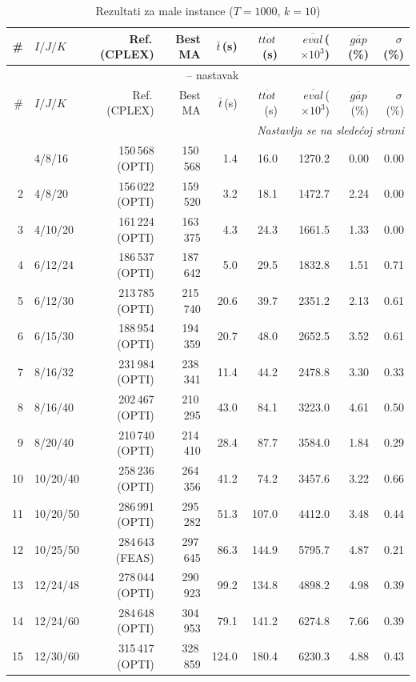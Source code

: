 \documentclass[12pt,a4paper]{article}
\begin{document}
\begin{longtable}{r l r r r r r r r}
\caption{Rezultati za male instance ($T=1000$, $k=10$)} \\
\toprule
\# & $I/J/K$ & Ref.\,(CPLEX) & Best MA & $\bar t$\,(s) & $\overline{ttot}$\,(s) & $\overline{eval}$\,($\times 10^3$) & $\overline{gap}$\,(\%) & $\sigma$\,(\%) \\
\midrule
\endfirsthead
\multicolumn{9}{c}{\tablename\ \thetable{} -- nastavak} \\
\toprule
\# & $I/J/K$ & Ref.\,(CPLEX) & Best MA & $\bar t$\,(s) & $\overline{ttot}$\,(s) & $\overline{eval}$\,($\times 10^3$) & $\overline{gap}$\,(\%) & $\sigma$\,(\%) \\
\midrule
\endhead
\midrule
\multicolumn{9}{r}{\textit{Nastavlja se na sledećoj strani}} \\
\endfoot
\bottomrule
\endlastfoot
1 & 4/8/16 & 150\,568 (OPTI) & 150\,568 & 1.4 & 16.0 & 1270.2 & 0.00 & 0.00 \\
2 & 4/8/20 & 156\,022 (OPTI) & 159\,520 & 3.2 & 18.1 & 1472.7 & 2.24 & 0.00 \\
3 & 4/10/20 & 161\,224 (OPTI) & 163\,375 & 4.3 & 24.3 & 1661.5 & 1.33 & 0.00 \\
4 & 6/12/24 & 186\,537 (OPTI) & 187\,642 & 5.0 & 29.5 & 1832.8 & 1.51 & 0.71 \\
5 & 6/12/30 & 213\,785 (OPTI) & 215\,740 & 20.6 & 39.7 & 2351.2 & 2.13 & 0.61 \\
6 & 6/15/30 & 188\,954 (OPTI) & 194\,359 & 20.7 & 48.0 & 2652.5 & 3.52 & 0.61 \\
7 & 8/16/32 & 231\,984 (OPTI) & 238\,341 & 11.4 & 44.2 & 2478.8 & 3.30 & 0.33 \\
8 & 8/16/40 & 202\,467 (OPTI) & 210\,295 & 43.0 & 84.1 & 3223.0 & 4.61 & 0.50 \\
9 & 8/20/40 & 210\,740 (OPTI) & 214\,410 & 28.4 & 87.7 & 3584.0 & 1.84 & 0.29 \\
10 & 10/20/40 & 258\,236 (OPTI) & 264\,356 & 41.2 & 74.2 & 3457.6 & 3.22 & 0.66 \\
11 & 10/20/50 & 286\,991 (OPTI) & 295\,282 & 51.3 & 107.0 & 4412.0 & 3.48 & 0.44 \\
12 & 10/25/50 & 284\,643 (FEAS) & 297\,645 & 86.3 & 144.9 & 5795.7 & 4.87 & 0.21 \\
13 & 12/24/48 & 278\,044 (OPTI) & 290\,923 & 99.2 & 134.8 & 4898.2 & 4.98 & 0.39 \\
14 & 12/24/60 & 284\,648 (OPTI) & 304\,953 & 79.1 & 141.2 & 6274.8 & 7.66 & 0.39 \\
15 & 12/30/60 & 315\,417 (OPTI) & 328\,859 & 124.0 & 180.4 & 6230.3 & 4.88 & 0.43 \\

\end{longtable}
\end{document}
